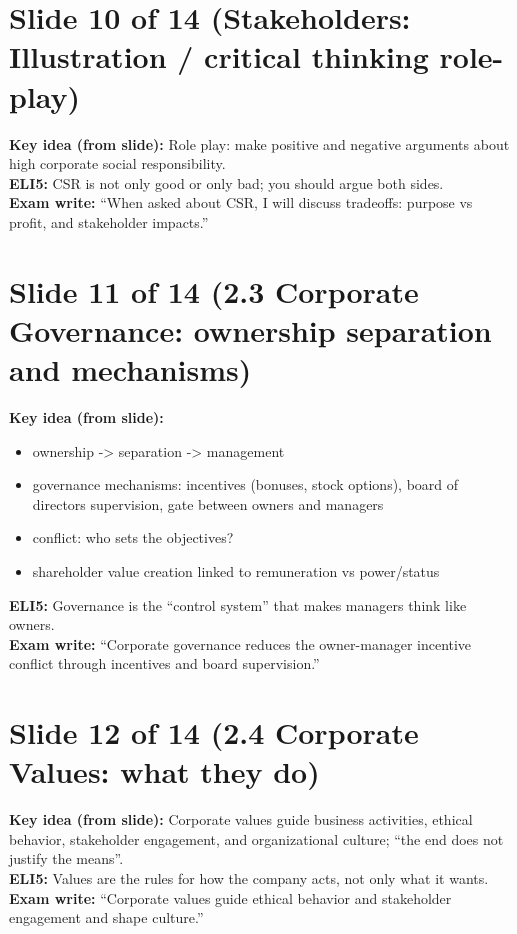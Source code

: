\documentclass[11pt,a4paper]{article}
\begin{document}
\section*{Slide 10 of 14 (Stakeholders: Illustration / critical thinking role-play)}
\textbf{Key idea (from slide):} Role play: make positive and negative arguments about high corporate social responsibility.\\
\textbf{ELI5:} CSR is not only good or only bad; you should argue both sides.\\
\textbf{Exam write:} ``When asked about CSR, I will discuss tradeoffs: purpose vs profit, and stakeholder impacts.''

\section*{Slide 11 of 14 (2.3 Corporate Governance: ownership separation and mechanisms)}
\textbf{Key idea (from slide):}
\begin{itemize}
  \item ownership -> separation -> management
  \item governance mechanisms: incentives (bonuses, stock options), board of directors supervision, gate between owners and managers
  \item conflict: who sets the objectives?
  \item shareholder value creation linked to remuneration vs power/status
\end{itemize}
\textbf{ELI5:} Governance is the ``control system'' that makes managers think like owners.\\
\textbf{Exam write:} ``Corporate governance reduces the owner-manager incentive conflict through incentives and board supervision.''

\section*{Slide 12 of 14 (2.4 Corporate Values: what they do)}
\textbf{Key idea (from slide):} Corporate values guide business activities, ethical behavior, stakeholder engagement, and organizational culture; ``the end does not justify the means''.\\
\textbf{ELI5:} Values are the rules for how the company acts, not only what it wants.\\
\textbf{Exam write:} ``Corporate values guide ethical behavior and stakeholder engagement and shape culture.''
\end{document}
